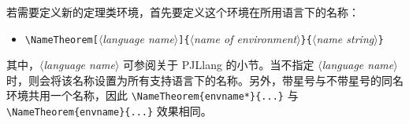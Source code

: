 \documentclass[Chinese,English,French,allowbf,puretext]{lebhart}
\providecommand{\meta}[1]{$\langle${\normalfont\itshape#1}$\rangle$}
\newenvironment{tip}[1][提示]{%
    \begin{tcolorbox}[breakable,
        enhanced,
        width = \textwidth,
        colback = paper, colbacktitle = paper,
        colframe = gray!50, boxrule=0.2mm,
        coltitle = black,
        fonttitle = \sffamily,
        attach boxed title to top left = {yshift=-\tcboxedtitleheight/2, xshift=.5cm},
        boxed title style = {boxrule=0pt, colframe=paper},
        before skip = 0.3cm,
        after skip = 0.3cm,
        top = 3mm,
        bottom = 3mm,
        title={\scshape\sffamily #1}]%
}{\end{tcolorbox}}
\providecommand{\PJLlang}{\textsf{PJLlang}}
\begin{document}
若需要定义新的定理类环境，首先要定义这个环境在所用语言下的名称：
\vspace{-.15\baselineskip}%
\begin{itemize}
    \item \lstinline|\NameTheorem[|\meta{language name}\lstinline|]{|\meta{name of environment}\lstinline|}{|\meta{name string}\lstinline|}|
\end{itemize}
\vspace{-.15\baselineskip}%
其中，\meta{language name} 可参阅关于 \PJLlang{} 的小节。当不指定 \meta{language name}时，则会将该名称设置为所有支持语言下的名称。另外，带星号与不带星号的同名环境共用一个名称，因此 \lstinline|\NameTheorem{envname*}{...}| 与 \lstinline|\NameTheorem{envname}{...}| 效果相同。
\end{document}
